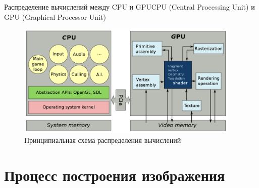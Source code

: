 \documentclass{beamer}
\begin{document}
\begin{frame}{Распределение вычислений между CPU и GPU}{CPU (Central Processing Unit) и GPU (Graphical Processor Unit)}
	\begin{figure}
		\includegraphics[width=0.95\textwidth]{images/Calculation_distribution_scheme.png}
		\caption{Принципиальная схема распределения вычислений}
	\end{figure}


\end{frame}

\section{Процесс построения изображения}
\end{document}
